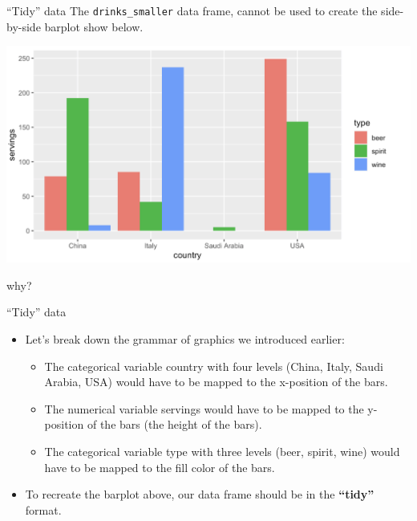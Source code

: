 \documentclass[
  ignorenonframetext,
]{beamer}
\begin{document}
\begin{frame}[fragile]{``Tidy'' data}
\protect\hypertarget{tidy-data-2}{}
The \texttt{drinks\_smaller} data frame, cannot be used to create the
side-by-side barplot show below.

\small

\begin{center}\includegraphics[width=0.7\linewidth,height=0.5\textheight]{week3new1} \end{center}
\normalsize

why?
\end{frame}

\begin{frame}{``Tidy'' data}
\protect\hypertarget{tidy-data-3}{}
\begin{itemize}
\item
  Let's break down the grammar of graphics we introduced earlier:

  \begin{itemize}
  \item
    The categorical variable country with four levels (China, Italy,
    Saudi Arabia, USA) would have to be mapped to the x-position of the
    bars.
  \item
    The numerical variable servings would have to be mapped to the
    y-position of the bars (the height of the bars).
  \item
    The categorical variable type with three levels (beer, spirit, wine)
    would have to be mapped to the fill color of the bars.
  \end{itemize}
\item
  To recreate the barplot above, our data frame should be in the
  \textbf{``tidy''} format.
\end{itemize}
\end{frame}
\end{document}
